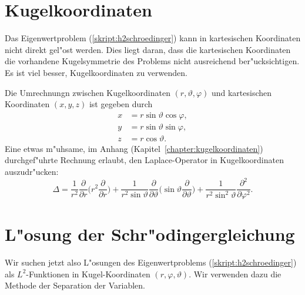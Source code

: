 \section{Kugelkoordinaten}
Das Eigenwertproblem (\ref{skript:h2schroedinger}) kann in kartesischen
Koordinaten nicht direkt gel"ost werden.
Dies liegt daran, dass die kartesischen
Koordinaten die vorhandene Kugelsymmetrie des Problems nicht ausreichend
ber"ucksichtigen. Es ist viel besser, Kugelkoordinaten zu verwenden.

Die Umrechnungn zwischen Kugelkoordinaten $(r,\vartheta,\varphi)$ und
kartesischen Koordinaten $(x,y,z)$ ist gegeben durch
\begin{align*}
x&=r
\sin\vartheta
\cos\varphi,
\\
y&=r
\sin\vartheta
\sin\varphi,
\\
z&=r\cos \vartheta.
\end{align*}
Eine etwas m"uhsame, im Anhang (Kapitel~\ref{chapter:kugelkoordinaten})
durchgef"uhrte Rechnung erlaubt, den Laplace-Operator in Kugelkoordinaten
auszudr"ucken:
\[
\Delta
=
\frac1{r^2}\frac{\partial}{\partial r}\biggl(
r^2\frac{\partial}{\partial r}
\biggr)
+\frac1{r^2\sin\vartheta}\frac{\partial}{\partial \vartheta}\biggl(
 \sin\vartheta \frac{\partial}{\partial\vartheta}
\biggr)
+
\frac1{r^2\sin^2\vartheta}\frac{\partial^2}{\partial\varphi^2}.
\]

\section{L"osung der Schr"odingergleichung\label{section:schroedinger}}
Wir suchen jetzt also L"osungen des Eigenwertproblems
(\ref{skript:h2schroedinger})
als $L^2$-Funktionen in Kugel-Koordinaten $(r,\varphi,\vartheta)$. Wir
verwenden dazu die Methode der Separation der Variablen.

